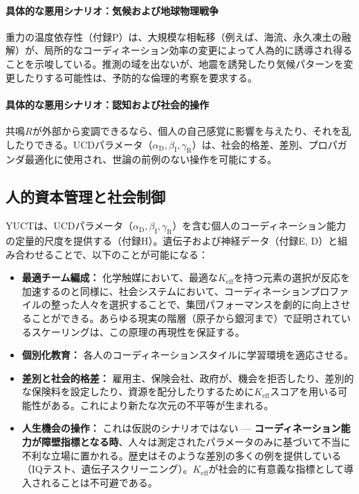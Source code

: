 \documentclass[12pt,a4paper]{article}
\theoremstyle{remark}
\newcommand{\Keff}{K_{\mathrm{eff}}}
\newcommand{\alD}{\alpha_{\mathrm{D}}}
\newcommand{\beI}{\beta_{\mathrm{I}}}
\newcommand{\gaR}{\gamma_{\mathrm{R}}}
\begin{document}
	\paragraph{具体的な悪用シナリオ：気候および地球物理戦争}
	重力の温度依存性（付録P）は、大規模な相転移（例えば、海流、永久凍土の融解）が、局所的なコーディネーション効率の変更によって人為的に誘導され得ることを示唆している。推測の域を出ないが、地震を誘発したり気候パターンを変更したりする可能性は、予防的な倫理的考察を要求する。
	
	\paragraph{具体的な悪用シナリオ：認知および社会的操作}
	共鳴\(R\)が外部から変調できるなら、個人の自己感覚に影響を与えたり、それを乱したりできる。UCDパラメータ（\(\alD,\beI,\gaR\)）は、社会的格差、差別、プロパガンダ最適化に使用され、世論の前例のない操作を可能にする。
	
	\subsection{人的資本管理と社会制御}
	\label{subsec:human}
	
	YUCTは、UCDパラメータ（\(\alD,\beI,\gaR\)）を含む個人のコーディネーション能力の定量的尺度を提供する（付録H）。遺伝子および神経データ（付録E, D）と組み合わせることで、以下のことが可能になる：
	\begin{itemize}[leftmargin=*]
		\item \textbf{最適チーム編成：} 化学触媒において、最適な\(\Keff\)を持つ元素の選択が反応を加速するのと同様に、社会システムにおいて、コーディネーションプロファイルの整った人々を選択することで、集団パフォーマンスを劇的に向上させることができる。あらゆる現実の階層（原子から銀河まで）で証明されているスケーリングは、この原理の再現性を保証する。
		\item \textbf{個別化教育：} 各人のコーディネーションスタイルに学習環境を適応させる。
		\item \textbf{差別と社会的格差：} 雇用主、保険会社、政府が、機会を拒否したり、差別的な保険料を設定したり、資源を配分したりするために\(\Keff\)スコアを用いる可能性がある。これにより新たな次元の不平等が生まれる。
		\item \textbf{人生機会の操作：} これは仮説のシナリオではない — \textbf{コーディネーション能力が障壁指標となる時}、人々は測定されたパラメータのみに基づいて不当に不利な立場に置かれる。歴史はそのような差別の多くの例を提供している（IQテスト、遺伝子スクリーニング）。\(\Keff\)が社会的に有意義な指標として導入されることは不可避である。
	\end{itemize}
	
\end{document}
